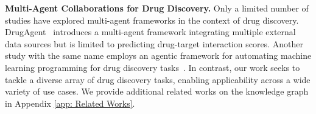 

\noindent \textbf{Multi-Agent Collaborations for Drug Discovery.}
Only a limited number of studies have explored multi-agent frameworks in the context of drug discovery. DrugAgent~\cite{inoue2024drugagent} introduces a multi-agent framework integrating multiple external data sources but is limited to predicting drug-target interaction scores.
Another study with the same name employs an agentic framework for automating machine learning programming for drug discovery tasks~\cite{liu2024drugagent}. 
In contrast, our work seeks to tackle a diverse array of drug discovery tasks, enabling applicability across a wide variety of use cases.
We provide additional related works on the knowledge graph in Appendix \ref{app: Related Works}.



